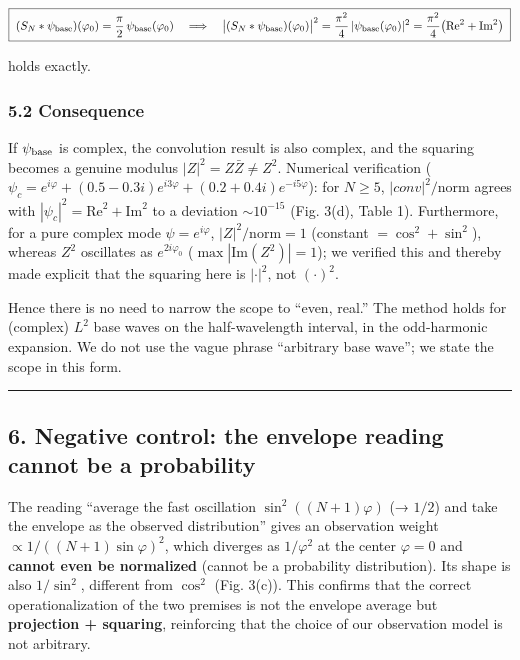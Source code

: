 \documentclass[
]{ltjsarticle}
\begin{document}
\[
\boxed{\;(S_N*\psi_{\rm base})(\varphi_0)=\frac{\pi}{2}\,\psi_{\rm base}(\varphi_0)
\quad\Longrightarrow\quad
\big|(S_N*\psi_{\rm base})(\varphi_0)\big|^2=\frac{\pi^2}{4}\,|\psi_{\rm base}(\varphi_0)|^2
=\frac{\pi^2}{4}\big(\mathrm{Re}^2+\mathrm{Im}^2\big)\;}
\]

holds exactly.

\subsubsection{5.2 Consequence}\label{consequence}

If \(\psi_{\rm base}\) is complex, the convolution result is also
complex, and the squaring becomes a genuine modulus
\(|Z|^2=Z\bar Z\ne Z^2\). Numerical verification
(\(\psi_c=e^{i\varphi}+(0.5-0.3i)e^{i3\varphi}+(0.2+0.4i)e^{-i5\varphi}\)):
for \(N\ge5\), \(|conv|^2/\mathrm{norm}\) agrees with
\(|\psi_c|^2=\mathrm{Re}^2+\mathrm{Im}^2\) to a deviation
\(\sim10^{-15}\) (Fig. 3(d), Table 1). Furthermore, for a pure complex
mode \(\psi=e^{i\varphi}\), \(|Z|^2/\mathrm{norm}=1\) (constant
\(=\cos^2+\sin^2\)), whereas \(Z^2\) oscillates as \(e^{2i\varphi_0}\)
(\(\max|\mathrm{Im}(Z^2)|=1\)); we verified this and thereby made
explicit that the squaring here is \(|\cdot|^2\), not \((\cdot)^2\).

Hence there is no need to narrow the scope to ``even, real.'' The method
holds for (complex) \(L^2\) base waves on the half-wavelength interval,
in the odd-harmonic expansion. We do not use the vague phrase
``arbitrary base wave''; we state the scope in this form.

\begin{center}\rule{0.5\linewidth}{0.5pt}\end{center}

\subsection{6. Negative control: the envelope reading cannot be a
probability}\label{negative-control-the-envelope-reading-cannot-be-a-probability}

The reading ``average the fast oscillation \(\sin^2((N+1)\varphi)\) (→
\(1/2\)) and take the envelope as the observed distribution'' gives an
observation weight \(\propto 1/((N+1)\sin\varphi)^2\), which diverges as
\(1/\varphi^2\) at the center \(\varphi=0\) and \textbf{cannot even be
normalized} (cannot be a probability distribution). Its shape is also
\(1/\sin^2\), different from \(\cos^2\) (Fig. 3(c)). This confirms that
the correct operationalization of the two premises is not the envelope
average but \textbf{projection + squaring}, reinforcing that the choice
of our observation model is not arbitrary.
\end{document}
